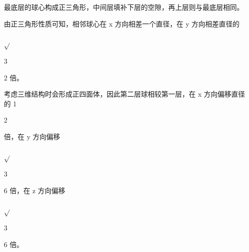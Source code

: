 最底层的球心构成正三角形，中间层填补下层的空隙，再上层则与最底层相同。\par
由正三角形性质可知，相邻球心在 x 方向相差一个直径，在 y 方向相差直径的\par
$\sqrt{}$\par
3\par
2 倍。\par
考虑三维结构时会形成正四面体，因此第二层球相较第一层，在 x 方向偏移直径的 1\par
2\par
倍，在 y 方向偏移\par
$\sqrt{}$\par
3\par
6 倍，在 z 方向偏移\par
$\sqrt{}$\par
3\par
6 倍。\par

